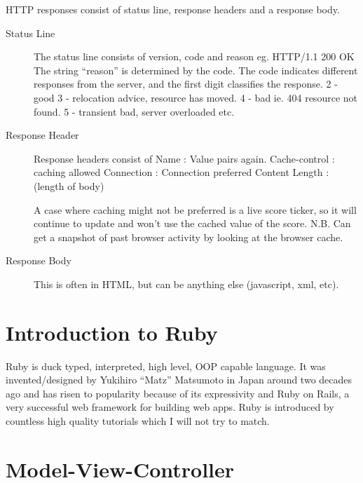 \documentclass[11pt]{article}
\begin{document}
HTTP responses consist of status line, response headers and a response body.
\begin{description}
\item[Status Line]
The status line consists of version, code and reason
eg.
HTTP/1.1    200    OK
The string ``reason'' is determined by the code. The code indicates different responses from the server, and the first digit classifies the response.
2 - good
3 - relocation advice, resource has moved.
4 - bad ie. 404 resource not found.
5 - transient bad, server overloaded etc.

\item[Response Header]
Response headers consist of Name    :    Value pairs again.
Cache-control    :    caching allowed
Connection    :    Connection preferred
Content Length    :    (length of body)

A case where caching might not be preferred is a live score ticker, so it will continue to update and won’t use the cached value of the score.
N.B. Can get a snapshot of past browser activity by looking at the browser cache.

\item[Response Body]
This is often in HTML, but can be anything else (javascript, xml, etc).
\end{description}



\section{Introduction to Ruby}
\label{sec:ruby}

Ruby is duck typed, interpreted, high level, OOP capable language. It was invented/designed by Yukihiro ``Matz'' Matsumoto in Japan around two decades ago and has risen to popularity because of its expressivity and Ruby on Rails, a very successful web framework for building web apps. Ruby is introduced by countless high quality tutorials which I will not try to match.


\section{Model-View-Controller}
\label{sec:MVC}
\end{document}
